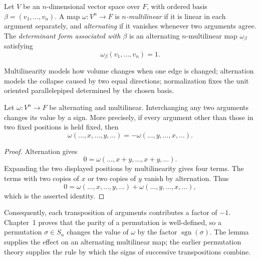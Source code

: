 \begin{definition}
Let \(V\) be an \(n\)-dimensional vector space over \(F\), with ordered basis
\(\beta=(v_1,\ldots,v_n)\). A map \(\omega:V^n\to F\) is
\emph{\(n\)-multilinear} if it is linear in each argument separately, and
\emph{alternating} if it vanishes whenever two arguments agree. The
\emph{determinant form associated with \(\beta\)} is an alternating
\(n\)-multilinear map \(\omega_\beta\) satisfying
\[
\omega_\beta(v_1,\ldots,v_n)=1.
\]
\end{definition}

Multilinearity models how volume changes when one edge is changed; alternation
models the collapse caused by two equal directions; normalization fixes the
unit oriented parallelepiped determined by the chosen basis.

\begin{lemma}\label{lem:alternating-sign-change}
Let \(\omega:V^n\to F\) be alternating and multilinear. Interchanging any
two arguments changes its value by a sign. More precisely, if every argument
other than those in two fixed positions is held fixed, then
\[
\omega(\ldots,x,\ldots,y,\ldots)
=-\omega(\ldots,y,\ldots,x,\ldots).
\]
\end{lemma}
\begin{proof}
Alternation gives
\[
0=\omega(\ldots,x+y,\ldots,x+y,\ldots).
\]
Expanding the two displayed positions by multilinearity gives four terms.
The terms with two copies of \(x\) or two copies of \(y\) vanish by
alternation. Thus
\[
0=\omega(\ldots,x,\ldots,y,\ldots)
 +\omega(\ldots,y,\ldots,x,\ldots),
\]
which is the asserted identity.
\end{proof}

Consequently, each transposition of arguments contributes a factor of
\(-1\). Chapter~1 proves that the parity of a permutation is well-defined,
so a permutation \(\sigma\in S_n\) changes the value of \(\omega\) by the
factor \(\operatorname{sgn}(\sigma)\). The lemma supplies the effect on an
alternating multilinear map; the earlier permutation theory supplies the
rule by which the signs of successive transpositions combine.

